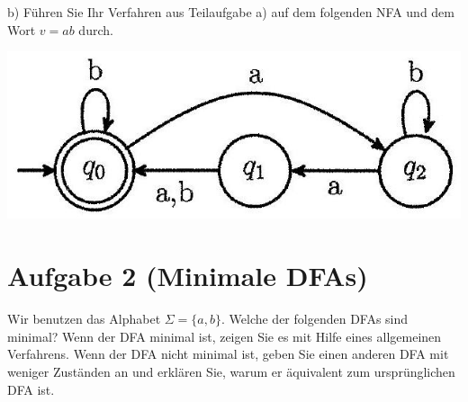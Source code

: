 \documentclass[10pt]{article}
\begin{document}
b) Führen Sie Ihr Verfahren aus Teilaufgabe a) auf dem folgenden NFA und dem Wort $v=a b$ durch.

\begin{center}
\includegraphics[max width=\textwidth]{2024_05_29_35588a07a9630e5c9887g-4}
\end{center}

\section*{Aufgabe 2 (Minimale DFAs)}
Wir benutzen das Alphabet $\Sigma=\{a, b\}$. Welche der folgenden DFAs sind minimal? Wenn der DFA minimal ist, zeigen Sie es mit Hilfe eines allgemeinen Verfahrens. Wenn der DFA nicht minimal ist, geben Sie einen anderen DFA mit weniger Zuständen an und erklären Sie, warum er äquivalent zum ursprünglichen DFA ist.\\
\end{document}
